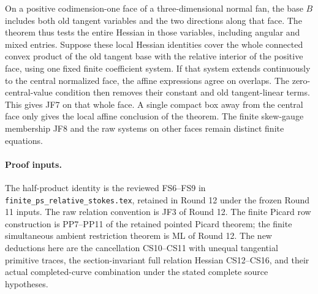 On a positive codimension-one face of a three-dimensional normal
fan, the base $B$ includes both old tangent variables and the
two directions along that face.  The theorem thus tests the
entire Hessian in those variables, including angular and mixed
entries.  Suppose these local Hessian identities cover the whole
connected convex product of the old tangent base with the
relative interior of the positive face, using one fixed finite
coefficient system.  If that system extends continuously to the
central normalized face, the affine expressions agree on
overlaps.  The zero-central-value condition then removes their
constant and old tangent-linear terms.  This gives JF7 on that
whole face.  A single compact box away from the central face
only gives the local affine conclusion of the theorem.  The finite
skew-gauge membership JF8 and the raw systems on other faces
remain distinct finite equations.

\paragraph{Proof inputs.}
The half-product identity is the reviewed FS6--FS9 in
\texttt{finite\_ps\_relative\_stokes.tex}, retained in Round 12
under the frozen Round 11 inputs.  The raw relation convention
is JF3 of Round 12.  The finite Picard row construction is
PP7--PP11 of the retained pointed Picard theorem; the finite
simultaneous ambient restriction theorem is ML of Round 12.
The new deductions here are the cancellation CS10--CS11 with
unequal tangential primitive traces, the section-invariant full
relation Hessian CS12--CS16, and their actual completed-curve
combination under the stated complete source hypotheses.
